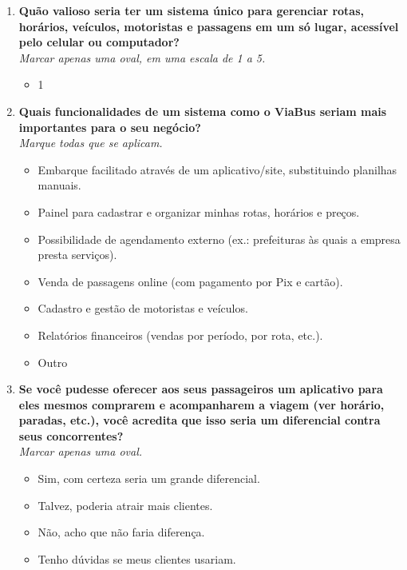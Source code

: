 \begin{apendicesenv}
\begin{enumerate}
    \item \textbf{Quão valioso seria ter um sistema único para gerenciar rotas, horários, veículos, motoristas e passagens em um só lugar, acessível pelo celular ou computador?} \\
          \textit{Marcar apenas uma oval, em uma escala de 1 a 5.}
          \begin{itemize}
            \item 1    
          \end{itemize}

    \item \textbf{Quais funcionalidades de um sistema como o ViaBus seriam mais importantes para o seu negócio?} \\
          \textit{Marque todas que se aplicam.}
          \begin{itemize}
            \item Embarque facilitado através de um aplicativo/site, substituindo planilhas manuais.
            \item Painel para cadastrar e organizar minhas rotas, horários e preços.
            \item Possibilidade de agendamento externo (ex.: prefeituras às quais a empresa presta serviços).
            \item Venda de passagens online (com pagamento por Pix e cartão).
            \item Cadastro e gestão de motoristas e veículos.
            \item Relatórios financeiros (vendas por período, por rota, etc.).
            \item Outro
          \end{itemize}

    \item \textbf{Se você pudesse oferecer aos seus passageiros um aplicativo para eles mesmos comprarem e acompanharem a viagem (ver horário, paradas, etc.), você acredita que isso seria um diferencial contra seus concorrentes?} \\
          \textit{Marcar apenas uma oval.}
          \begin{itemize}
            \item Sim, com certeza seria um grande diferencial.
            \item Talvez, poderia atrair mais clientes.
            \item Não, acho que não faria diferença.
            \item Tenho dúvidas se meus clientes usariam.
          \end{itemize}


\end{enumerate}
\end{apendicesenv}

